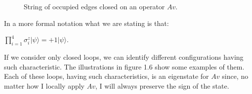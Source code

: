 \documentclass{Configuration_Files/PoliMi3i_thesis}
\begin{document}
\begin{figure}
\begin{center}
\end{center}

\caption{String of occupied edges closed on an operator $Av$.}
\label{fig:Aveigen}
\end{figure}
		
In a more formal notation what we are stating is that:

\begin{center}
	$\prod_{i=1}^{4} \sigma_{i}^{z} |\psi\rangle = +1 |\psi\rangle$. 
\end{center}

If we consider only closed loops, we can identify different configurations having such characteristic. The illustrations in figure 1.6 show some examples of them.
Each of these loops, having such characteristics, is an eigenstate for $Av$ since, no matter how I locally apply $Av$, I will always preserve the sign of the state. 

\end{document}
